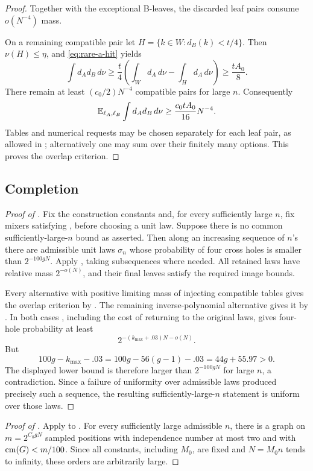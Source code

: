 \begin{proof}
Together with the exceptional B-leaves, the discarded leaf pairs
consume \(o(N^{-4})\) mass.

On a remaining compatible pair let
\(H=\{k\in W:d_B(k)<t/4\}\).
Then \(\nu(H)\le\eta\), and \eqref{eq:rare-a-hit} yields
\[
 \int d_A d_B\,d\nu
   \ge \frac t4\left(\int_Wd_A\,d\nu-\int_Hd_A\,d\nu\right)
   \ge \frac{tA_0}{8}.
\]
There remain at least \((c_0/2)N^{-4}\) compatible pairs for large \(n\).
Consequently
\begin{equation}
       \mathbb E_{\ell_A,\ell_B}\int d_A d_B\,d\nu
          \ge \frac{c_0tA_0}{16}N^{-4}.
 \label{eq:rare-overlap-bound}
\end{equation}
Tables and numerical requests may be chosen separately for each
leaf pair, as allowed in ; alternatively one may
sum over their finitely many options.
This proves the overlap criterion.
\end{proof}

\subsection{Completion}

\begin{proof}[Proof of ]
Fix the construction constants and, for every sufficiently large \(n\),
fix mixers satisfying , before choosing a unit law.
Suppose there is no common sufficiently-large-\(n\) bound as asserted.
Then along an increasing sequence of \(n\)'s there are admissible
unit laws \(\sigma_n\) whose probability of four cross holes is
smaller than \(2^{-100gN}\).
Apply , taking subsequences
where needed.  All retained laws have relative mass \(2^{-o(N)}\),
and their final leaves satisfy the required image bounds.

Every alternative with positive limiting mass of injecting compatible
tables gives the overlap criterion by .
The remaining inverse-polynomial alternative gives it by
.
In both cases , including the cost of returning
to the original laws, gives four-hole probability at least
\[
      2^{-(k_{\max}+.03)N-o(N)}.
 \]
But
\[
 100g-k_{\max}-.03
   =100g-56(g-1)-.03
   =44g+55.97>0.
\]
The displayed lower bound is therefore larger than \(2^{-100gN}\)
for large \(n\), a contradiction.
Since a failure of uniformity over admissible laws produced precisely
such a sequence, the resulting sufficiently-large-\(n\) statement
is uniform over those laws.
\end{proof}

\begin{proof}[Proof of ]
Apply  to .
For every sufficiently large admissible \(n\), there is a graph on
\(m=2^{C_0gN}\) sampled positions with independence number at most two
and with \(\operatorname{cm}(G)<m/100\).
Since all constants, including \(M_0\), are fixed and
\(N=M_0n\) tends to infinity, these orders are arbitrarily large.
\end{proof}
